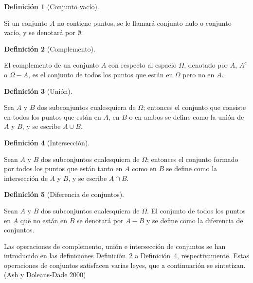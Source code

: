 \documentclass[
  us-letterpaper,
]{scrreprt}
\theoremstyle{plain}
\theoremstyle{definition}
\theoremstyle{plain}
\theoremstyle{definition}
\newtheorem{definition}{Definición}[chapter]
\theoremstyle{remark}
\begin{document}
\begin{definition}[Conjunto
vacío]\protect\hypertarget{def-emptyset}{}\label{def-emptyset}

Si un conjunto \(A\) no contiene puntos, se le llamará conjunto nulo o
conjunto vacío, y se denotará por \(\emptyset\).

\end{definition}

\begin{definition}[Complemento]\protect\hypertarget{def-comp}{}\label{def-comp}

El complemento de un conjunto \(A\) con respecto al espacio \(\Omega\),
denotado por \(\overline{A}\), \(A^c\) o \(\Omega-A\), es el conjunto de
todos los puntos que están en \(\Omega\) pero no en \(A\).

\end{definition}

\begin{definition}[Unión]\protect\hypertarget{def-union}{}\label{def-union}

Sea \(A\) y \(B\) dos subconjuntos cualesquiera de \(\Omega\); entonces
el conjunto que consiste en todos los puntos que están en \(A\), en
\(B\) o en ambos se define como la unión de \(A\) y \(B\), y se escribe
\(A \cup B\).

\end{definition}

\begin{definition}[Intersección]\protect\hypertarget{def-inter}{}\label{def-inter}

Sean \(A\) y \(B\) dos subconjuntos cualesquiera de \(\Omega\); entonces
el conjunto formado por todos los puntos que están tanto en \(A\) como
en \(B\) se define como la intersección de \(A\) y \(B\), y se escribe
\(A \cap B\).

\end{definition}

\begin{definition}[Diferencia de
conjuntos]\protect\hypertarget{def-dfc}{}\label{def-dfc}

Sean \(A\) y \(B\) dos subconjuntos cualesquiera de \(\Omega\). El
conjunto de todos los puntos en \(A\) que no están en \(B\) se denotará
por \(A-B\) y se define como la diferencia de conjuntos.

\end{definition}

Las operaciones de complemento, unión e intersección de conjuntos se han
introducido en las definiciones Definición~\ref{def-comp} a
Definición~\ref{def-inter}, respectivamente. Estas operaciones de
conjuntos satisfacen varias leyes, que a continuación se sintetizan.
(Ash y Doleans-Dade 2000)
\end{document}

